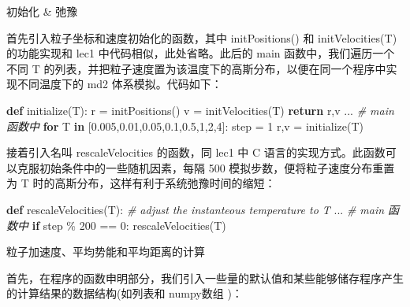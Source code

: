 \documentclass[
]{article}
\newenvironment{Shaded}{}{}
\newcommand{\CommentTok}[1]{\textcolor[rgb]{0.38,0.63,0.69}{\textit{#1}}}
\newcommand{\ControlFlowTok}[1]{\textcolor[rgb]{0.00,0.44,0.13}{\textbf{#1}}}
\newcommand{\DecValTok}[1]{\textcolor[rgb]{0.25,0.63,0.44}{#1}}
\newcommand{\FloatTok}[1]{\textcolor[rgb]{0.25,0.63,0.44}{#1}}
\newcommand{\KeywordTok}[1]{\textcolor[rgb]{0.00,0.44,0.13}{\textbf{#1}}}
\newcommand{\NormalTok}[1]{#1}
\newcommand{\OperatorTok}[1]{\textcolor[rgb]{0.40,0.40,0.40}{#1}}
\begin{document}
初始化 \& 弛豫

首先引入粒子坐标和速度初始化的函数，其中 initPositions() 和
initVelocities(T) 的功能实现和 lec1 中代码相似，此处省略。此后的 main
函数中，我们遍历一个不同 T
的列表，并把粒子速度置为该温度下的高斯分布，以便在同一个程序中实现不同温度下的
md2 体系模拟。代码如下：

\begin{Shaded}
\begin{Highlighting}[]
\KeywordTok{def}\NormalTok{ initialize(T):}
\NormalTok{	r }\OperatorTok{=}\NormalTok{ initPositions()}
\NormalTok{	v }\OperatorTok{=}\NormalTok{ initVelocities(T)}
	\ControlFlowTok{return}\NormalTok{ r,v}
\NormalTok{...}
\CommentTok{\# main 函数中}
\ControlFlowTok{for}\NormalTok{ T }\KeywordTok{in}\NormalTok{ [}\FloatTok{0.005}\NormalTok{,}\FloatTok{0.01}\NormalTok{,}\FloatTok{0.05}\NormalTok{,}\FloatTok{0.1}\NormalTok{,}\FloatTok{0.5}\NormalTok{,}\DecValTok{1}\NormalTok{,}\DecValTok{2}\NormalTok{,}\DecValTok{4}\NormalTok{]:}
\NormalTok{	step }\OperatorTok{=} \DecValTok{1}
\NormalTok{	r,v }\OperatorTok{=}\NormalTok{ initialize(T)}
\end{Highlighting}
\end{Shaded}

接着引入名叫 rescaleVelocities 的函数，同 lec1 中 C
语言的实现方式。此函数可以克服初始条件中的一些随机因素，每隔 500
模拟步数，便将粒子速度分布重置为 T
时的高斯分布，这样有利于系统弛豫时间的缩短：

\begin{Shaded}
\begin{Highlighting}[]
\KeywordTok{def}\NormalTok{ rescaleVelocities(T):  }\CommentTok{\# adjust the instanteous temperature to T}
\NormalTok{...}
\CommentTok{\# main 函数中}
\ControlFlowTok{if}\NormalTok{ step }\OperatorTok{\%} \DecValTok{200} \OperatorTok{==} \DecValTok{0}\NormalTok{:}
\NormalTok{    rescaleVelocities(T)}
\end{Highlighting}
\end{Shaded}

粒子加速度、平均势能和平均距离的计算

首先，在程序的函数申明部分，我们引入一些量的默认值和某些能够储存程序产生的计算结果的数据结构(如列表和
numpy数组 )：
\end{document}
